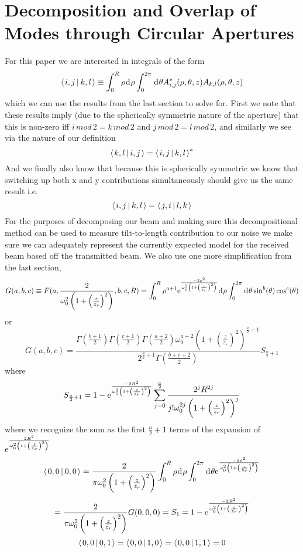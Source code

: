 \documentclass[11pt]{amsart}
\makeatletter
\newcommand{\e}{{\rm e}}				%
\newcommand{\msp}[1]{\mspace{#1mu}}		%
\newcommand{\0}{\varnothing}		%
\newcommand{\eq}{\equiv}		%
\newcommand{\dd}{\msp{1} {\rm{d}} \msp{1}}	%
\newcommand{\brac}[2]{\left\langle\msp{2} #1\left\lvert \msp{3.5} #2 \right.\right\rangle}	%
\newcommand{\1}{!}
\newcommand{\2}{@}
\newcommand{\3}{\#}
\newcommand{\4}{\$}
\newcommand{\5}{\%}
\newcommand{\6}{$^\wedge$}
\newcommand{\7}{\&}
\newcommand{\8}{*}
\newcommand{\9}{(}
\makeatother
\begin{document}
\section{Decomposition and Overlap of Modes through Circular Apertures}
For this paper we are interested in integrals of the form
\[
\brac{i,j}{k,l} \eq \int_0^R\rho \dd \rho\int_0^{2\pi}\dd \theta A^*_{i,j}(\rho,\theta,z)A_{k,l}(\rho,\theta,z)
\]
which we can use the results from the last section to solve for. First we note that these results imply (due to the spherically symmetric nature of the aperture) that this is non-zero iff $i\,mod\,2 = k\,mod\,2$ and $j\,mod\,2 = l\,mod\,2$, and similarly we see via the nature of our definition 
\[
\brac{k,l}{i,j} = \brac{i,j}{k,l}^*
\]
And we finally also know that because this is spherically symmetric we know that switching up both x and y contributions simultaneously should give us the same result i.e.
\[
\brac{i,j}{k,l} = \brac{j,i}{l,k}
\]
For the purposes of decomposing our beam and making sure this decompositional method can be used to measure tilt-to-length contribution to our noise we make sure we can adequately represent the currently expected model for the received beam based off the transmitted beam. We also use one more simplification from the last section,
\[
G(a,b,c) \eq F(a,\frac{2}{\omega_0^2\left(1+\left(\frac{z}{z_r}\right)^2\right)},b,c,R) = \int_0^R \rho^{a+1} \e^{\frac{-2\rho^2}{\omega_0^2\left(1+\left(\frac{z}{z_r}\right)^2\right)}}\dd\rho\int_0^{2\pi}\dd \theta \sin^b(\theta)\cos^c(\theta)
\]
or
\[
G(a,b,c) =\frac{\Gamma\left(\frac{b+1}{2}\right)\Gamma\left(\frac{c+1}{2}\right)\Gamma\left(\frac{a+2}{2}\right)\omega_0^{a+2}\left(1+\left(\frac{z}{z_r}\right)^2\right)^{\frac{a}{2}+1}}{2^{\frac{a}{2}+1}\Gamma\left(\frac{b+c+2}{2}\right)}S_{\frac{a}{2}+1}
\]
where 
\[
S_{\frac{a}{2}+1} = 1-\e^{\frac{-2R^2}{\omega_0^2\left(1+\left(\frac{z}{z_r}\right)^2\right)}}\sum_{j=0}^{\frac{a}{2}}\frac{2^jR^{2j}}{j!\omega_0^{2j}\left(1+\left(\frac{z}{z_r}\right)^2\right)^j}
\]
where we recognize the sum as the first $\frac{a}{2}+1$ terms of the expansion of $\e^{\frac{2R^2}{\omega_0^2\left(1+\left(\frac{z}{z_r}\right)^2\right)}}$
\[
\brac{0,0}{0,0} = \frac{2}{\pi\omega_0^2\left(1+\left(\frac{z}{z_r}\right)^2\right)}\int_0^R \rho \dd \rho \int_0^{2\pi} \dd \theta \e^{\frac{-2\rho^2}{\omega_0^2\left(1+\left(\frac{z}{z_r}\right)^2\right)}}
\]
\[
=\frac{2}{\pi\omega_0^2\left(1+\left(\frac{z}{z_r}\right)^2\right)}G(0,0,0) = S_1 = 1-\e^{\frac{-2R^2}{\omega_0^2\left(1+\left(\frac{z}{z_r}\right)^2\right)}}
\]
\[
\brac{0,0}{0,1} = \brac{0,0}{1,0} = \brac{0,0}{1,1} = 0
\]
\end{document}
